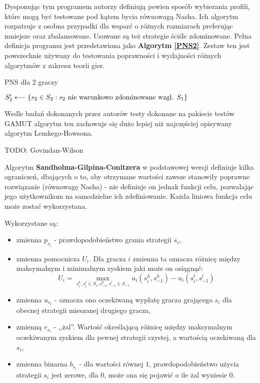 \documentclass[polish]{standalone}
\begin{document}
Dysponując tym programem autorzy definiują pewien sposób wybierania profili, które mogą być testowane pod kątem bycia
równowagą Nasha. Ich algorytm rozpatruje z osobna przypadki dla wsparć o różnych rozmiarach preferując mniejsze oraz
zbalansowane. Usuwane są też strategie ściśle zdominowane. Pełna definicja programu jest przedstawiona jako
\textbf{Algorytm \ref{PNS2}}. Zestaw ten jest powszechnie używany do testowania poprawności i wydajności różnych
algorytmów z zakresu teorii gier.

\begin{algorithm}
\caption{PNS dla 2 graczy}
\label{PNS2}
\begin{algorithmic}
  \STATE $S_2' \longleftarrow \{ s_2 \in S_2: s_2 \textrm{ nie warunkowo zdominowane wzgl. } S_1 \}$
      \ENDIF
    \ENDIF
   \ENDFOR
  \ENDIF
 \ENDFOR
\ENDFOR
\end{algorithmic}
\end{algorithm}

Wedle badań dokonanych przez autorów testy dokonane na pakiecie testów GAMUT algorytm ten zachowuje się dużo lepiej niż
najczęściej opisywany algorytm Lemkego-Howsona.

TODO: Govindan-Wilson

Algorytm \textbf{Sandholma-Gilpina-Conitzera} w podstawowej wersji definiuje kilka ograniczeń, dbających o to, aby 
otrzymane wartości zawsze stanowiły poprawne rozwiązanie (równowagę Nasha) - nie definiuje on jednak funkcji celu,
pozwalając jego użytkownikom na samodzielne ich zdefiniowanie. Każda liniowa funkcja celu może zostać wykorzystana.

Wykorzystane są: 
\begin{itemize}
\item zmienna $p_{s_i}$ - prawdopodobieństwo grania strategii $s_i$,
\item zmienna pomocnicza $U_i$. Dla gracza $i$ zmienna ta oznacza różnicę między maksymalnym i minimalnym zyskiem jaki
może on osiągnąć:
$$U_i = \max_{s_i^h, s_i^l \in S_i, s_{-1}^h, s_{-1}^l \in S_{-1}} u_i(s_i^h, s_{-1}^h) - u_i(s_i^l, s_{-1}^l)$$
\item zmienna $u_{s_i}$ - oznacza ono oczekiwaną wypłatę gracza grającego $s_i$ dla obecnej strategii mieszanej drugiego
gracza,
\item zmienną $r_{s_i}$ - ,,żal''. Wartość określającą różnicę między maksymalnym oczekiwanym zyskiem dla pewnej
strategii czystej, a wartością oczekiwaną dla $s_i$,
\item zmienna binarna $b_{s_i}$ - dla wartości równej $1$, prawdopodobieństwo użycia strategii $s_i$ jest zerowe,
dla $0$, może ona się pojawić o ile żal wyniesie $0$.
\end{itemize}
\end{document}
